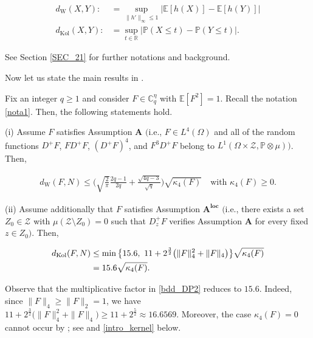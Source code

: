 \documentclass[ECP,preprint]{ejpecp}
\newcommand{\E}{\mathbb{E}}
\newcommand{\PP}{\mathbb{P}}
\newcommand{\R}{\mathbb{R}}
\newcommand{\cZ}{\mathcal{Z}}
\newcommand{\sZ}{\mathscr{Z}}
\newcommand{\bC}{\mathbb{C}^\eta}
\newcommand{\dK}{d_{\mathrm{Kol}}}
\newcommand{\dW}{d_{\mathrm W}}
\newcommand{\noi}{\noindent}
\begin{document}
\noi
\begin{align}
\dW(X, Y) : &=      \sup_{\| h'\|_\infty \leq 1} |\E [ h(X)]  -\E[  h(Y) ] | 
\label{def_dW} \\
 \dK(X,Y) : &= \sup_{t\in\R} | \PP(X\leq t) - \PP(Y \leq t) |.
\label{def_dK} 
 \end{align}




\noi
 See Section \ref{SEC_21}
for further notations and background.

Now let us state the main results in \cite{DP18}.

\enlargethispage{2\baselineskip}

\begin{theorem} \label{thm_DP18}
Fix an integer $q\geq 1$ and consider  $F\in\bC_q$ with $\E[ F^2] =1$.
Recall the notation \eqref{nota1}.
Then, the following statements hold. 

\smallskip
\noi
{\rm (i)} Assume  $F$ satisfies Assumption $\mathbf{A}$
{\rm$\big($}i.e.,   $F\in L^4(\Omega)$ and
all of the random functions
$D^+F$, $FD^+F$, $(D^+F)^4$, and $F^3D^+F$
belong to  $L^1(\Omega\times\cZ,\PP\otimes\mu)${\rm$\big)$}.
Then,

\noi
\begin{align}\label{bdd_DP1}
\dW(F, N) \leq \Big( \sqrt{\frac{2}{\pi}} \frac{2q-1}{2q} + \frac{\sqrt{4q-3}}{\sqrt{q}} \Big)
\sqrt{\kappa_4(F)} \quad \text{with   $\kappa_4(F)\geq 0$.}
\end{align}



\noi
{\rm (ii)} Assume additionally that $F$ satisfies Assumption $\mathbf{A}^{\textbf{loc}}$ 
{\rm$\big($}i.e., there exists a set $Z_0\in\sZ$ with $\mu(\cZ\setminus Z_0) =0$
such that $D^+_zF$ verifies  Assumption  $\mathbf{A}$
for every fixed $z\in Z_0${\rm$\big)$}.
Then, 

\noi
\begin{align}\label{bdd_DP2}
\dK(F, N) 
&\leq  \min\big\{15.6,     \,\,  11 + 2^{\frac32} \big(   \|F\|_4^2 + \| F\|_4   \big)    \big\}
\sqrt{\kappa_4(F)} \\
&= 15.6 \sqrt{\kappa_4(F)}. \notag
\end{align}

\end{theorem}

Observe that the multiplicative factor in \eqref{bdd_DP2} reduces to
$15.6$. Indeed, since
$\|F\|_4\geq \|F\|_2=1$, we have
$
11+2^{\frac32}
\bigl(\|F\|_4^2+\|F\|_4\bigr)
\geq
11+2^{\frac52}
\approx 16.6569.$
%
%
Moreover, the case $\kappa_4(F) =0$ cannot occur
by
\cite[Prop. 1.6]{DP18}; see  
\cite[Rem. 5.2]{DVZ18} and \eqref{intro_kernel} below.
\end{document}
